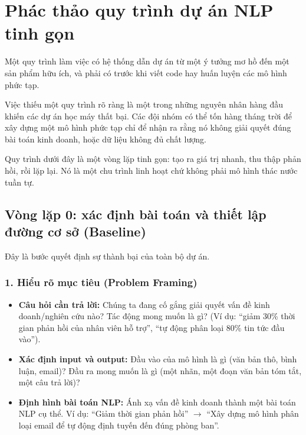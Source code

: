 

\section{Phác thảo quy trình dự án NLP tinh gọn}
\label{sec:lean_workflow}

Một quy trình làm việc có hệ thống dẫn dự án từ một ý tưởng mơ hồ đến một sản phẩm hữu ích, và phải có trước khi viết code hay huấn luyện các mô hình phức tạp.

Việc thiếu một quy trình rõ ràng là một trong những nguyên nhân hàng đầu khiến các dự án học máy thất bại. Các đội nhóm có thể tốn hàng tháng trời để xây dựng một mô hình phức tạp chỉ để nhận ra rằng nó không giải quyết đúng bài toán kinh doanh, hoặc dữ liệu không đủ chất lượng.

Quy trình dưới đây là một vòng lặp tinh gọn: tạo ra giá trị nhanh, thu thập phản hồi, rồi lặp lại. Nó là một chu trình linh hoạt chứ không phải mô hình thác nước tuần tự.

\begin{center}
    \label{fig:nlp_workflow_cycle}
\end{center}

\subsection{Vòng lặp 0: xác định bài toán và thiết lập đường cơ sở (Baseline)}
\label{ssec:workflow_step0}
Đây là bước quyết định sự thành bại của toàn bộ dự án.

\subsubsection{1. Hiểu rõ mục tiêu (Problem Framing)}
\begin{itemize}
    \item \textbf{Câu hỏi cần trả lời:} Chúng ta đang cố gắng giải quyết vấn đề kinh doanh/nghiên cứu nào? Tác động mong muốn là gì? (Ví dụ: “giảm 30\% thời gian phản hồi của nhân viên hỗ trợ”, “tự động phân loại 80\% tin tức đầu vào”).
    \item \textbf{Xác định input và output:} Đầu vào của mô hình là gì (văn bản thô, bình luận, email)? Đầu ra mong muốn là gì (một nhãn, một đoạn văn bản tóm tắt, một câu trả lời)?
    \item \textbf{Định hình bài toán NLP:} Ánh xạ vấn đề kinh doanh thành một bài toán NLP cụ thể. Ví dụ: “Giảm thời gian phản hồi” $\rightarrow$ “Xây dựng mô hình phân loại email để tự động định tuyến đến đúng phòng ban”.
\end{itemize}

